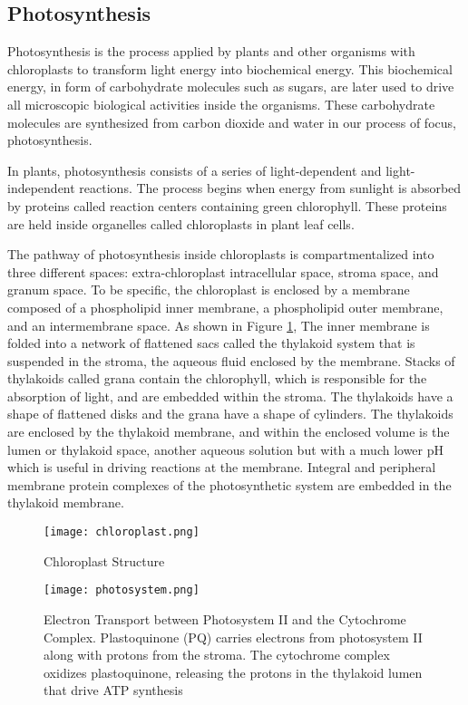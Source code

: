 \documentclass[12pt,reqno]{amsart}
\begin{document}
	\subsection*{Photosynthesis}
	
	
	Photosynthesis is the process applied by plants and other 
	organisms with chloroplasts to transform light energy into 
	biochemical energy. This biochemical energy, in form of 
	carbohydrate molecules such as sugars, are later used to drive 
	all microscopic biological activities inside the organisms. 
	These carbohydrate molecules are synthesized from carbon 
	dioxide and water in our process of focus, photosynthesis. 	
	
	In plants, photosynthesis consists of a series of light-dependent 
	and light-independent reactions. The process begins when energy 
	from sunlight is absorbed by proteins called reaction centers 
	containing green chlorophyll. These proteins are held inside 
	organelles called chloroplasts in plant leaf cells\cite{photo_wiki}.
	
	The pathway of photosynthesis inside chloroplasts is compartmentalized 
	into three different spaces: extra-chloroplast intracellular space, 
	stroma space, and granum space. To be specific, the chloroplast 
	is enclosed by a membrane composed of a phospholipid inner 
	membrane, a phospholipid outer membrane, and an intermembrane space. 
	As shown in Figure \ref{Chloroplast}, The inner membrane is folded
	into a network of flattened sacs called the thylakoid system that 
	is suspended in the stroma, the aqueous fluid enclosed by the membrane. 
	Stacks of thylakoids called grana contain the chlorophyll, 
	which is responsible for the absorption of light, and are embedded 
	within the stroma. The thylakoids have a shape of flattened disks 
	and the grana have a shape of cylinders. The thylakoids are 
	enclosed by the thylakoid membrane, and within the enclosed 
	volume is the lumen or thylakoid space, another aqueous solution
	but with a much lower pH which is useful in driving reactions at 
	the membrane. Integral and peripheral membrane protein complexes 
	of the photosynthetic system are embedded in the thylakoid membrane.
	
	\begin{figure}[h]
        \caption{Chloroplast Structure\cite{chloroplast}}
        \centering
        \texttt{[image: chloroplast.png]}
        \label{Chloroplast}
    \end{figure}
    
    \begin{figure}[h!]
        \caption{Electron Transport between Photosystem II 
                 and the Cytochrome Complex. Plastoquinone (PQ) 
                 carries electrons from photosystem II along with 
                 protons from the stroma. The cytochrome complex 
                 oxidizes plastoquinone, releasing the protons in 
                 the thylakoid lumen that drive ATP synthesis}
        \centering
        \texttt{[image: photosystem.png]}
        \label{photosystem}
    \end{figure}
	
\end{document}
